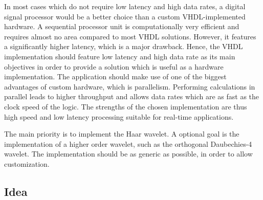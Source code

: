 \begin{refsection}
In most cases which do not require low latency and high data rates, a digital signal processor would be a better choice than a custom VHDL-implemented hardware.
A sequential processor unit is computationally very efficient and requires almost no area compared to most VHDL solutions.
However, it features a significantly higher latency, which is a major drawback.
Hence, the VHDL implementation should feature low latency and high data rate as its main objectives in order to provide a solution which is useful as a hardware implementation.
The application should make use of one of the biggest advantages of custom hardware, which is parallelism.
Performing calculations in parallel leads to higher throughput and allows data rates which are as fast as the clock speed of the logic.
The strengths of the chosen implementation are thus high speed and low latency processing suitable for real-time applications.

The main priority is to implement the Haar wavelet.
A optional goal is the implementation of a higher order wavelet, such as the orthogonal Daubechies-4 wavelet.
The implementation should be as generic as possible, in order to allow customization.

\subsection{Idea}


\end{refsection}
